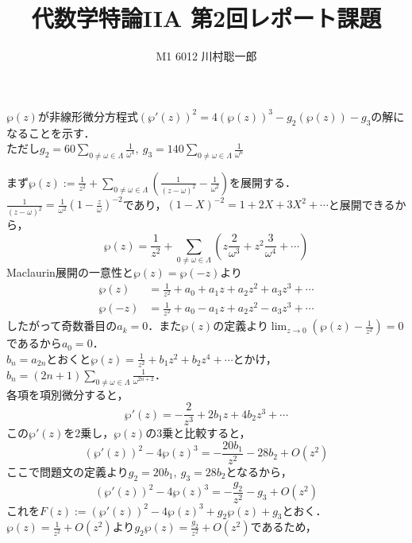\documentclass[dvipdfmx]{jsreport}
\title{代数学特論IIA 第2回レポート課題}
\author{M1 6012 川村聡一郎}
\date{}
\begin{document}
\maketitle
\begin{tcolorbox}
	$\wp(z)$が非線形微分方程式$(\wp'(z))^2= 4(\wp(z))^3- g_2(\wp(z))- g_3$の解になることを示す．\\
	ただし$g_2= 60\sum_{0\ne \omega\in \Lambda}\frac{1}{\omega^4},\ g_3= 140\sum_{0\ne \omega\in \Lambda}\frac{1}{\omega^6}$
\end{tcolorbox}

    まず$\wp(z):= \frac{1}{z^2}+ \sum_{0\ne \omega\in \Lambda}\left(\frac{1}{(z- \omega)^2}- \frac{1}{\omega^2}\right)$を展開する．\\
    $\frac{1}{(z-\omega)^2} = \frac{1}{\omega^2}\left(1- \frac{z}{\omega}\right)^{-2}$であり，$(1- X)^{-2}= 1+ 2X+ 3X^2+ \cdots$と展開できるから，
\begin{equation*}
    \wp(z)= \frac{1}{z^2}+ \sum_{0\ne \omega\in \Lambda}\left( z\frac{2}{\omega^3}+ z^2\frac{3}{\omega^4}+ \cdots \right)
\end{equation*}
    Maclaurin展開の一意性と$\wp(z)= \wp(-z)$より
\begin{align*}
    \wp(z)&= \frac{1}{z^2}+ a_0+ a_1z+ a_2z^2+ a_3z^3+ \cdots\\
    \wp(-z)&= \frac{1}{z^2}+ a_0- a_1z+ a_2z^2- a_3z^3+ \cdots
\end{align*}
    したがって奇数番目の$a_k=0$．また$\wp(z)$の定義より$\lim_{z\to 0}\left(\wp(z)- \frac{1}{z^2}\right)= 0$であるから$a_0= 0$．\\
    $b_n= a_{2n}$とおくと$\wp(z)= \frac{1}{z^2}+ b_1z^2+ b_2z^4+ \cdots$とかけ，$b_n= (2n+ 1)\sum_{0\ne \omega\in \Lambda}\frac{1}{\omega^{2n+ 2}}$．\\
    各項を項別微分すると，
\begin{equation*}
    \wp'(z)= -\frac{2}{z^3}+ 2b_1z+ 4b_2z^3+ \cdots
\end{equation*}
    この$\wp'(z)$を2乗し，$\wp(z)$の3乗と比較すると，
\begin{equation*}
    (\wp'(z))^2- 4\wp(z)^3= -\frac{20b_1}{z^2}- 28b_2+ O(z^2)
\end{equation*}
    ここで問題文の定義より$g_2= 20b_1,\ g_3= 28b_2$となるから，
\begin{equation*}
    (\wp'(z))^2- 4\wp(z)^3= -\frac{g_2}{z^2}- g_3+ O(z^2)
\end{equation*}
    これを$F(z):= (\wp'(z))^2- 4\wp(z)^3+ g_2\wp(z)+ g_3$とおく．$\wp(z) = \frac{1}{z^2} + O(z^2)$より$g_2\wp(z) = \frac{g_2}{z^2} + O(z^2)$であるため，
\end{document}
